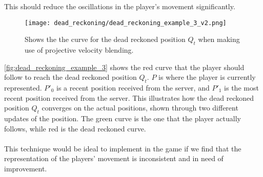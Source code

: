 This should reduce the oscillations in the player's movement significantly.
\begin{figure}[H]
    \centering
    \texttt{[image: dead\_reckoning/dead\_reckoning\_example\_3\_v2.png]}
    \caption{Shows the the curve for the dead reckoned position $Q_t$ when making use of projective velocity blending.}
    \label{fig:dead_reckoning_example_3}
\end{figure}
\noindent
\autoref{fig:dead_reckoning_example_3} shows the red curve that the player should follow to reach the dead reckoned position $Q_t$.
$ P $ is where the player is currently represented.
$ P'_0 $ is a recent position received from the server, and $P'_1$ is the most recent position received from the server.
This illustrates how the dead reckoned position $Q_t$ converges on the actual positions, shown through two different updates of the position.
The green curve is the one that the player actually follows, while red is the dead reckoned curve.
\\\\
This technique would be ideal to implement in the game if we find that the representation of the players' movement is inconsistent and in need of improvement.

